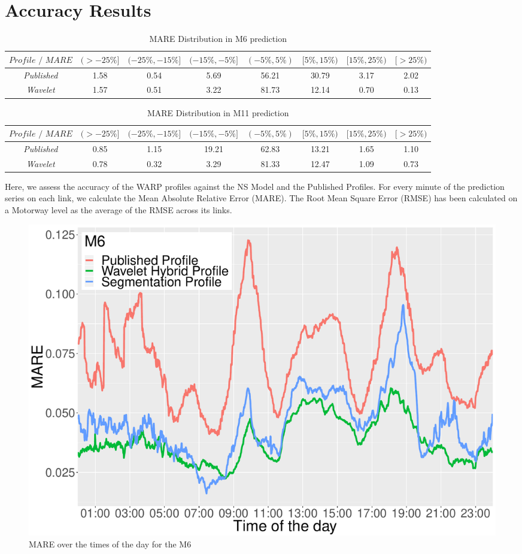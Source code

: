 \documentclass[a4paper, 10pt, conference]{ieeeconf}      %
\begin{document}
\section{Accuracy Results}
\begin{table}[bp]
	\caption{MARE Distribution in M6 prediction}
	\centering
	\begin{center}
	\begin{tabular}{SSSSSSSS} \toprule
    {$\textit{Profile / MARE}$} & {$(>-25\%]$} & {$(-25\%,-15\%] $} & {$(-15\%,-5\%]$} & {$(-5\%,5\%)$} & {$[5\%,15\%)$} & {$[15\%,25\%)$} & {$[>25\%)$} \\ \midrule
    \textit{Published}  & 1.58 & 0.54 & 5.69 & 56.21 & 30.79 & 3.17 & 2.02 \\
    \textit{Wavelet}  & 1.57  & 0.51 & 3.22  & 81.73 & 12.14 & 0.70  & 0.13 \\ \bottomrule
\end{tabular}
	\end{center}
\end{table}
\begin{table}[bp]
	\caption{MARE Distribution in M11 prediction}
	\centering
	\begin{center}
	\begin{tabular}{SSSSSSSS} \toprule
    {$\textit{Profile / MARE}$} & {$(>-25\%]$} & {$(-25\%,-15\%] $} & {$(-15\%,-5\%]$} & {$(-5\%,5\%)$} & {$[5\%,15\%)$} & {$[15\%,25\%)$} & {$[>25\%)$} \\ \midrule
    \textit{Published}  & 0.85 & 1.15 & 19.21 & 62.83 & 13.21 & 1.65 & 1.10 \\
    \textit{Wavelet}  & 0.78  & 0.32 & 3.29  & 81.33 & 12.47 & 1.09  & 0.73 \\ \bottomrule
\end{tabular}
	\end{center}
\end{table}
Here, we assess the accuracy of the WARP profiles against the NS Model and the Published Profiles.
For every minute of the prediction series on each link, we calculate the Mean Absolute Relative Error (MARE).
The Root Mean Square Error (RMSE) has been calculated on a Motorway level as the average of the RMSE across its links.
\begin{figure}[htbp]
	\centerline{\includegraphics[width=\linewidth]{./images/M6_daytime_8_12.pdf}}
	\caption{MARE over the times of the day for the M6}
	\label{fig:m6dt}
\end{figure}
\end{document}
